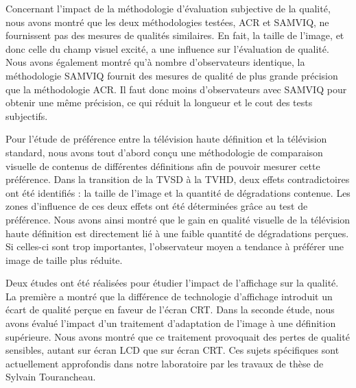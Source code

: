 Concernant l'impact de la méthodologie d’évaluation subjective de la qualité, nous avons montré que les deux méthodologies testées, ACR et SAMVIQ, ne fournissent pas des mesures de qualités similaires. En fait, la taille de l'image, et donc celle du champ visuel excité, a une influence sur l'évaluation de qualité. Nous avons également montré qu'à nombre d'observateurs identique, la méthodologie SAMVIQ fournit des mesures de qualité de plus grande précision que la méthodologie ACR. Il faut donc moins d'observateurs avec SAMVIQ pour obtenir une même précision, ce qui réduit la longueur et le cout des tests subjectifs.

Pour l'étude de préférence entre la télévision haute définition et la télévision standard, nous avons tout d'abord conçu une méthodologie de comparaison visuelle de contenus de différentes définitions afin de pouvoir mesurer cette préférence. Dans la transition de la TVSD à la TVHD, deux effets contradictoires ont été identifiés : la taille de l'image et la quantité de dégradations contenue. Les zones d'influence de ces deux effets ont été déterminées grâce au test de préférence. Nous avons ainsi montré que le gain en qualité visuelle de la télévision haute définition est directement lié à une faible quantité de dégradations perçues. Si celles-ci sont trop importantes, l'observateur moyen a tendance à préférer une image de taille plus réduite.

Deux études ont été réalisées pour étudier l'impact de l'affichage sur la qualité. La première a montré que la différence de technologie d'affichage introduit un écart de qualité perçue en faveur de l'écran CRT. Dans la seconde étude, nous avons évalué l'impact d'un traitement d'adaptation de l'image à une définition supérieure. Nous avons montré que ce traitement provoquait des pertes de qualité sensibles, autant sur écran LCD que sur écran CRT. Ces sujets spécifiques sont actuellement approfondis dans notre laboratoire par les travaux de thèse de Sylvain Tourancheau.

\bigskip

